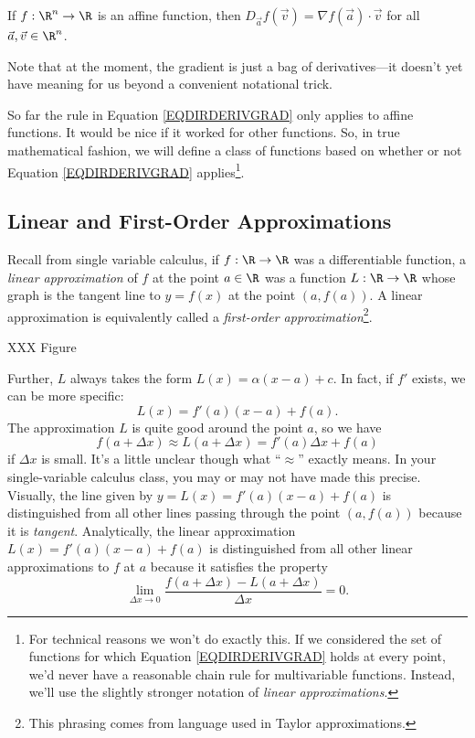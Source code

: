 \begin{theorem}
	\label{THMAFFINEDERIV}
	If $f:\R^n\to\R$ is an affine function, then
	$
		D_{\vec a}f(\vec v) = \nabla f(\vec a)\cdot \vec v
	$
	for all $\vec a,\vec v\in\R^n$.
\end{theorem}

Note that at the moment, the gradient is just a bag of derivatives---it
doesn't yet have meaning for us beyond a convenient notational trick.

So far the rule in Equation \eqref{EQDIRDERIVGRAD} only applies to affine functions.
It would be nice if it worked for other functions.  So, in true mathematical
fashion, we will define a class of functions based on whether or not Equation
\eqref{EQDIRDERIVGRAD} applies\footnote{ For technical reasons we won't do exactly this.
If we considered the set of functions for which Equation \eqref{EQDIRDERIVGRAD}
holds at every point, we'd never have a reasonable chain rule for multivariable
functions.  Instead, we'll use the slightly stronger notation of \emph{linear approximations}.}.

\subsection{Linear and First-Order Approximations}

Recall from single variable calculus, if $f:\R\to\R$ was a differentiable function,
a \emph{linear approximation} of $f$ at the point $a\in\R$ was a function $L:\R\to\R$
whose graph is the tangent line to $y=f(x)$ at the point $(a,f(a))$.  A linear approximation
is equivalently called a \emph{first-order approximation}\footnote{ This phrasing comes from
language used in Taylor approximations.}.

XXX Figure

Further, $L$ always takes the form $L(x)=\alpha(x-a)+c$.  In fact, if $f'$ exists,
we can be more
specific:  \[L(x)=f'(a)(x-a)+f(a).\]
The approximation $L$ is quite good around the point $a$, so we have
\[
	f(a+\Delta x)\approx L(a+\Delta x) = f'(a)\Delta x+f(a)
\]
if $\Delta x$ is small.  It's a little unclear though what ``$\approx$''
exactly means.  In your single-variable calculus class, you may or may not
have made this precise.  Visually, the line given by $y=L(x)=f'(a)(x-a)+f(a)$
is distinguished from all other lines passing through the point $(a,f(a))$ because
it is \emph{tangent}.  Analytically, the linear approximation $L(x)=f'(a)(x-a)+f(a)$
is distinguished from all other linear approximations to $f$ at $a$ because it satisfies
the property
\begin{equation}
	\label{EQONEVARLINAPPROX}
	\lim_{\Delta x\to 0} \frac{f(a+\Delta x)-L(a+\Delta x)}{\Delta x} = 0.
\end{equation}

